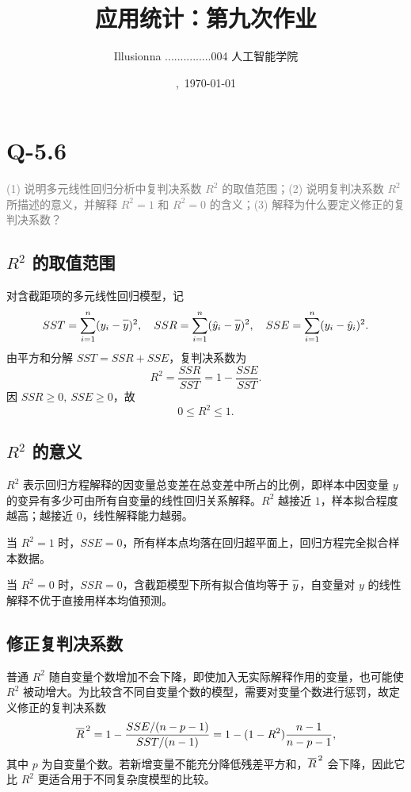 \documentclass{article}
\title{\vspace*{-3em}应用统计：第九次作业}
\author{Illusionna \quad 2025...............004 \quad 人工智能学院}
\date{\currenttime,\ \today}
\newcommand{\barline}[1]{\overline{#1\rule{0pt}{1.5ex}}}
\begin{document}
\maketitle

\section{Q-5.6}

\textcolor{gray}{(1) 说明多元线性回归分析中复判决系数 $R^2$ 的取值范围；(2) 说明复判决系数 $R^2$ 所描述的意义，并解释 $R^2=1$ 和 $R^2=0$ 的含义；(3) 解释为什么要定义修正的复判决系数？}

\subsection{$R^2$ 的取值范围}

对含截距项的多元线性回归模型，记
\[
    SST=\sum_{i=1}^{n}(y_i-\barline{y})^2,\quad
    SSR=\sum_{i=1}^{n}(\hat{y}_i-\barline{y})^2,\quad
    SSE=\sum_{i=1}^{n}(y_i-\hat{y}_i)^2 .
\]
由平方和分解 $SST=SSR+SSE$，复判决系数为
\[
    R^2=\dfrac{SSR}{SST}=1-\dfrac{SSE}{SST}.
\]
因 $SSR\geqslant 0,\ SSE\geqslant 0$，故
\[
    0\leqslant R^2\leqslant 1.
\]

\subsection{$R^2$ 的意义}

$R^2$ 表示回归方程解释的因变量总变差在总变差中所占的比例，即样本中因变量 $y$ 的变异有多少可由所有自变量的线性回归关系解释。$R^2$ 越接近 $1$，样本拟合程度越高；越接近 $0$，线性解释能力越弱。

当 $R^2=1$ 时，$SSE=0$，所有样本点均落在回归超平面上，回归方程完全拟合样本数据。

当 $R^2=0$ 时，$SSR=0$，含截距模型下所有拟合值均等于 $\barline{y}$，自变量对 $y$ 的线性解释不优于直接用样本均值预测。

\subsection{修正复判决系数}

普通 $R^2$ 随自变量个数增加不会下降，即使加入无实际解释作用的变量，也可能使 $R^2$ 被动增大。为比较含不同自变量个数的模型，需要对变量个数进行惩罚，故定义修正的复判决系数
\[
    \barline{R}^{\,2}
    =1-\dfrac{SSE/(n-p-1)}{SST/(n-1)}
    =1-(1-R^2)\dfrac{n-1}{n-p-1},
\]
其中 $p$ 为自变量个数。若新增变量不能充分降低残差平方和，$\barline{R}^{\,2}$ 会下降，因此它比 $R^2$ 更适合用于不同复杂度模型的比较。
\end{document}
